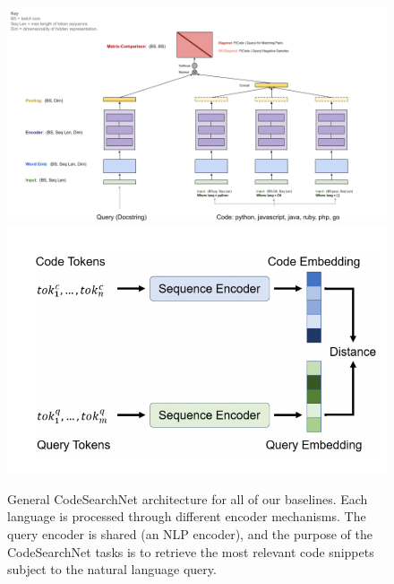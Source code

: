\documentclass{article}
\begin{document}
\begin{figure}[!ht]
    \centering
    \includegraphics[scale=0.22]{figures/codesearchnet_arch.png}
    \includegraphics[scale=0.22]{figures/codesearchnet_approach.png}
    \caption{General CodeSearchNet architecture for all of our baselines. Each language is processed through different encoder mechanisms. The query encoder is shared (an NLP encoder), and the purpose of the CodeSearchNet tasks is to retrieve the most relevant code snippets subject to the natural language query.}
    \label{fig:codesearchnet_arch}
\end{figure}
\end{document}
